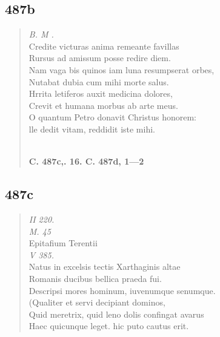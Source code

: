 \documentclass[11pt, a4paper]{report}
\begin{document}
            \subsection*{487b}
      \begin{verse}
      \textit{B. M .} \\ Credite victuras anima remeante favillas \\ Rursus ad amissum posse redire diem. \\ Nam vaga bis quinos iam luna resumpserat orbes, \\ Nutabat dubia cum mihi morte salus. \\ Hrrita letiferos auxit medicina dolores, \\ Crevit et humana morbus ab arte meus. \\ O quantum Petro donavit Christus honorem: \\ lle dedit vitam, reddidit iste mihi. \\ 
        ﻿\pagebreak 
    \begin{center} \textbf{C. 487c,. 16. C. 487d, 1—2} \end{center} \marginpar{[40]} 
      \end{verse}
  
            \subsection*{487c}
      \begin{verse}
      \textit{II 220.} \\ \textit{M. 45} \\ Epitafium Terentii \\ \textit{V 385.} \\ Natus in excelsis tectis Xarthaginis altae \\ Romanis ducibus bellica praeda fui. \\ Descripsi mores hominum, iuvenumque senumque. \\ (Qualiter et servi decipiant dominos, \\ Quid meretrix, quid leno dolis confingat avarus \\ Haec quicunque leget. hic puto cautus erit. \\ 
      \end{verse}
  
\end{document}

